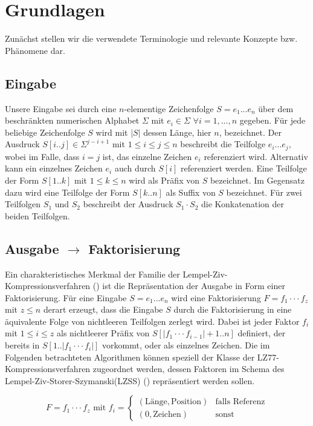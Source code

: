 \chapter{Grundlagen}

Zunächst stellen wir die verwendete Terminologie und relevante Konzepte bzw. Phänomene dar.

\section{Eingabe}
Unsere Eingabe sei durch eine $n$-elementige Zeichenfolge $S=e_1...e_n$ über dem beschränkten numerischen Alphabet $\Sigma$ mit $e_i\in \Sigma$ $\forall i=1,...,n$ gegeben. Für jede
beliebige Zeichenfolge $S$ wird mit $|S|$ dessen Länge, hier $n$, bezeichnet. Der Ausdruck $S[i..j]\in \Sigma^{j-i+1}$ mit $1\leq i\leq j\leq n$ beschreibt die Teilfolge $e_i...e_j$,
wobei im Falle, dass $i=j$ ist, das einzelne Zeichen $e_i$ referenziert wird. Alternativ kann ein einzelnes Zeichen $e_i$ auch durch $S[i]$ referenziert werden. Eine Teilfolge 
der Form $S[1..k]$ mit $1\leq k\leq n$ wird als Präfix von $S$ bezeichnet. Im Gegensatz dazu wird eine Teilfolge der Form $S[k..n]$ als Suffix von $S$ bezeichnet. Für zwei Teilfolgen
$S_1$ und $S_2$ beschreibt der Ausdruck $S_1\cdot S_2$ die Konkatenation der beiden Teilfolgen.

\section{Ausgabe $\rightarrow$ Faktorisierung}
Ein charakteristisches Merkmal der Familie der Lempel-Ziv-Kompressionsverfahren (\cite{LemZiv}) ist die Repräsentation der Ausgabe in Form einer Faktorisierung. Für eine Eingabe $S=e_1...e_n$ 
wird eine Faktorisierung $F=f_1\cdot\cdot\cdot f_z$ mit $z\leq n$ derart erzeugt, dass die Eingabe $S$ durch die Faktorisierung in eine äquivalente Folge von nichtleeren Teilfolgen 
zerlegt wird. Dabei ist jeder Faktor $f_i$ mit $1\leq i\leq z$ als nichtleerer Präfix von $S[|f_1\cdot\cdot\cdot f_{i-1}|+1..n]$ definiert, der bereits in $S[1..|f_1\cdot\cdot\cdot f_i|]$ 
vorkommt, oder als einzelnes Zeichen. Die im Folgenden betrachteten Algorithmen können speziell der Klasse der LZ77-Kompressionsverfahren zugeordnet werden, dessen Faktoren im Schema 
des Lempel-Ziv-Storer-Szymanski(LZSS) (\cite{lzss}) repräsentiert werden sollen. 

\begin{equation} \label{eq:faktor}
    F = f_1\cdot\cdot\cdot f_z \text{ mit } f_i = \begin{cases} (\text{Länge}, \text{Position}) & \text{falls Referenz} \\ (0, \text{Zeichen}) & \text{sonst} \end{cases}
\end{equation}

